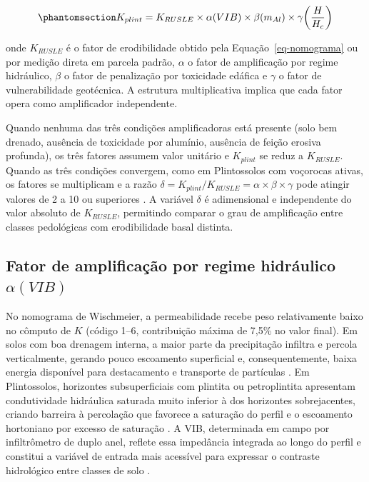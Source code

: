 \documentclass[
  brazilian,
  authoryear,
  preprint]{elsarticle}
\begin{document}
\begin{equation}\phantomsection\label{eq-kplint}{
K_{plint} = K_{RUSLE} \times \alpha(VIB) \times \beta(m_{Al}) \times \gamma\!\left(\dfrac{H}{H_c}\right)
}\end{equation}

onde \(K_{RUSLE}\) é o fator de erodibilidade obtido pela
Equação~\ref{eq-nomograma} ou por medição direta em parcela padrão,
\(\alpha\) o fator de amplificação por regime hidráulico, \(\beta\) o
fator de penalização por toxicidade edáfica e \(\gamma\) o fator de
vulnerabilidade geotécnica. A estrutura multiplicativa implica que cada
fator opera como amplificador independente.

Quando nenhuma das três condições amplificadoras está presente (solo bem
drenado, ausência de toxicidade por alumínio, ausência de feição erosiva
profunda), os três fatores assumem valor unitário e \(K_{plint}\) se
reduz a \(K_{RUSLE}\). Quando as três condições convergem, como em
Plintossolos com voçorocas ativas, os fatores se multiplicam e a razão
\(\delta = K_{plint}/K_{RUSLE} = \alpha \times \beta \times \gamma\)
pode atingir valores de 2 a 10 ou superiores \citep{poesen_2018}. A
variável \(\delta\) é adimensional e independente do valor absoluto de
\(K_{RUSLE}\), permitindo comparar o grau de amplificação entre classes
pedológicas com erodibilidade basal distinta.

\subsection{\texorpdfstring{Fator de amplificação por regime hidráulico
\(\alpha(VIB)\)}{Fator de amplificação por regime hidráulico \textbackslash alpha(VIB)}}\label{fator-de-amplificauxe7uxe3o-por-regime-hidruxe1ulico-alphavib}

No nomograma de Wischmeier, a permeabilidade recebe peso relativamente
baixo no cômputo de \(K\) (código 1--6, contribuição máxima de 7,5\% no
valor final). Em solos com boa drenagem interna, a maior parte da
precipitação infiltra e percola verticalmente, gerando pouco escoamento
superficial e, consequentemente, baixa energia disponível para
destacamento e transporte de partículas \citep{deroo_1992}. Em
Plintossolos, horizontes subsuperficiais com plintita ou petroplintita
apresentam condutividade hidráulica saturada muito inferior à dos
horizontes sobrejacentes, criando barreira à percolação que favorece a
saturação do perfil e o escoamento hortoniano por excesso de saturação
\citep{padmanabhan_2005}. A VIB, determinada em campo por infiltrômetro
de duplo anel, reflete essa impedância integrada ao longo do perfil e
constitui a variável de entrada mais acessível para expressar o
contraste hidrológico entre classes de solo
\citep{bertoni_lombardi_neto_2017}.
\end{document}
